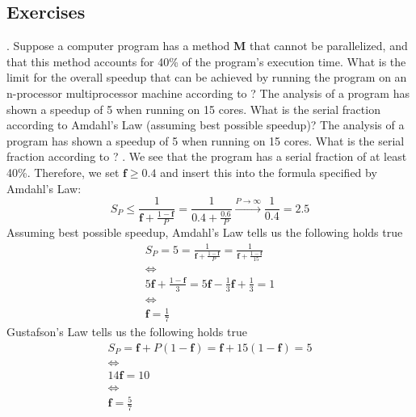\documentclass[main.tex]{subfiles}
\begin{document}
\pagebreak

\subsection{Exercises}

\begin{ExerciseList}
    \Exercise[title={Amdahl's Law, Gustafson's Law, Performance},label=AGL].
        \Question Suppose a computer program has a method \textbf{M} that cannot be parallelized, and that this method accounts for 40\% of the program’s execution time. What is the limit for the overall speedup that can be achieved by running the program on an n-processor multiprocessor machine according to ?
        \Question The analysis of a program has shown a speedup of 5 when running on 15 cores. What is the serial fraction according to Amdahl's Law (assuming best possible speedup)?
        \Question The analysis of a program has shown a speedup of 5 when running on 15 cores. What is the serial fraction according to ?
    \Answer[ref={AGL}].
        \Question We see that the program has a serial fraction of at least 40\%. Therefore, we set $\mathbf{f} \geq 0.4$ and insert this into the formula specified by Amdahl's Law:
            \begin{equation*}
                S_P \leq \frac{1}{\mathbf{f} + \frac{1-\mathbf{f}}{P}} = \frac{1}{0.4 + \frac{0.6}{P}} \xrightarrow{P \rightarrow \infty} \frac{1}{0.4} = 2.5
            \end{equation*}
        \Question Assuming best possible speedup, Amdahl's Law tells us the following holds true
            \begin{gather*}
                S_P = 5 = \frac{1}{\mathbf{f}+\frac{1-\mathbf{f}}{P}} = \frac{1}{\mathbf{f}+\frac{1-\mathbf{f}}{15}} \\
                \Longleftrightarrow\\
                5 \mathbf{f} + \frac{1-\mathbf{f}}{3} = 5 \mathbf{f} - \frac{1}{3} \mathbf{f} + \frac{1}{3} = 1\\
                \Longleftrightarrow\\
                \mathbf{f} = \frac{1}{7}
            \end{gather*}
        \Question Gustafson's Law tells us the following holds true
            \begin{gather*}
                S_P = \mathbf{f} + P (1 - \mathbf{f})
                    = \mathbf{f} + 15 (1 - \mathbf{f})
                    = 5 \\
                \Longleftrightarrow\\
                14 \mathbf{f} = 10\\
                \Longleftrightarrow\\
                \mathbf{f} = \frac{5}{7}
            \end{gather*}
        

\end{ExerciseList}
\end{document}
